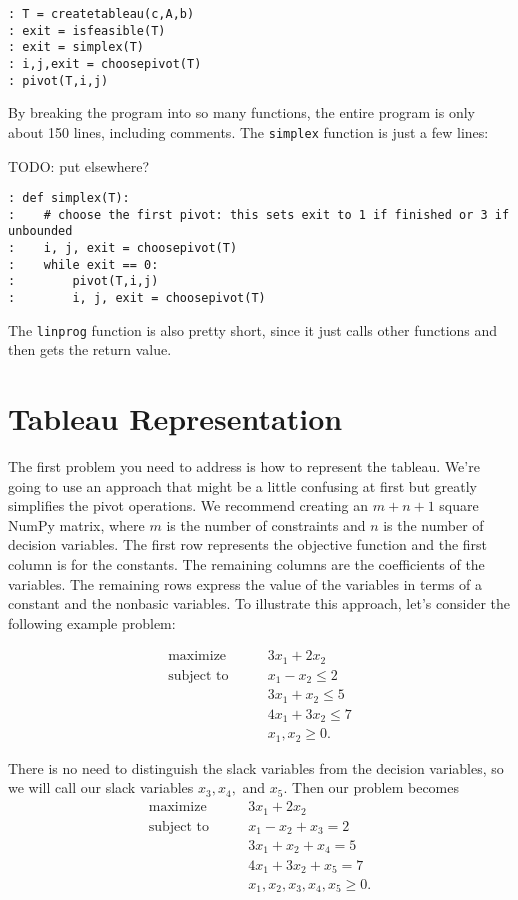 \begin{lstlisting}
: T = createtableau(c,A,b)
: exit = isfeasible(T)
: exit = simplex(T)
: i,j,exit = choosepivot(T)
: pivot(T,i,j)
\end{lstlisting}

By breaking the program into so many functions, the entire program is only about 150 lines, including comments.
The {\tt simplex} function is just a few lines:

TODO: put elsewhere?

\begin{lstlisting}
: def simplex(T):
:    # choose the first pivot: this sets exit to 1 if finished or 3 if unbounded
:    i, j, exit = choosepivot(T)
:    while exit == 0:
:        pivot(T,i,j)
:        i, j, exit = choosepivot(T)
\end{lstlisting}
The {\tt linprog} function is also pretty short, since it just calls other functions and then gets the return value.

\section*{Tableau Representation}

The first problem you need to address is how to represent the tableau.
We're going to use an approach that might be a little confusing at first but greatly simplifies the pivot operations.
We recommend creating an $m + n + 1$ square NumPy matrix, where $m$ is the number of constraints and $n$ is the number of decision variables.
The first row represents the objective function and the first column is for the constants.
The remaining columns are the coefficients of the variables.
The remaining rows express the value of the variables in terms of a constant and the nonbasic variables.
To illustrate this approach, let's consider the following example problem:

\begin{align*}
	\mbox{maximize}\qquad
        &    3x_1 + 2x_2 \\
	\mbox{subject to}\qquad
        &     x_1 - x_2 \leq 2 \\
		&	 3x_1 + x_2 \leq 5 \\
		&	 4x_1 + 3x_2 \leq 7 \\
		&     x_1, x_2 \geq 0.
\end{align*}

There is no need to distinguish the slack variables from the decision variables, so we will call our slack variables $x_3, x_4,$ and $x_5$.
Then our problem becomes
\begin{align*}
	\mbox{maximize}\qquad
        &    3x_1 + 2x_2 \\
	\mbox{subject to}\qquad
        &     x_1 - x_2 + x_3 = 2 \\
		&	 3x_1 + x_2 + x_4 = 5 \\
		&	 4x_1 + 3x_2 + x_5 = 7 \\
		&     x_1, x_2, x_3, x_4, x_5 \geq 0.
\end{align*}

